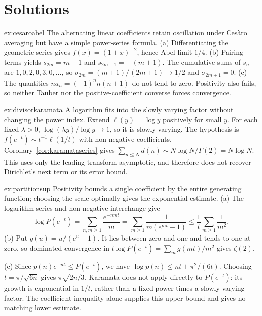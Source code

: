 \section{Solutions}
\begin{solution}{ex:cesaroabel}
\idea The alternating linear coefficients retain oscillation under Ces\`aro averaging but have a simple power-series formula.
\writeup (a) Differentiating the geometric series gives $f(x)=(1+x)^{-2}$, hence Abel limit $1/4$. (b) Pairing terms yields $s_{2m}=m+1$ and $s_{2m+1}=-(m+1)$. The cumulative sums of $s_n$ are $1,0,2,0,3,0,\ldots$, so $\sigma_{2m}=(m+1)/(2m+1)\to1/2$ and $\sigma_{2m+1}=0$. (c) The quantities $na_n=(-1)^nn(n+1)$ do not tend to zero. Positivity also fails, so neither Tauber nor the positive-coefficient converse forces convergence.
\end{solution}
\begin{solution}{ex:divisorkaramata}
\idea A logarithm fits into the slowly varying factor without changing the power index.
\writeup Extend $\ell(y)=\log y$ positively for small $y$. For each fixed $\lambda>0$, $\log(\lambda y)/\log y\to1$, so it is slowly varying. The hypothesis is $f(e^{-t})\sim t^{-1}\ell(1/t)$ with non-negative coefficients. Corollary~\ref{cor:karamataseries} gives $\sum_{n\le N}d(n)\sim N\log N/\Gamma(2)=N\log N$. This uses only the leading transform asymptotic, and therefore does not recover Dirichlet's next term or its error bound.
\end{solution}
\begin{solution}{ex:partitionsup}
\idea Positivity bounds a single coefficient by the entire generating function; choosing the scale optimally gives the exponential estimate.
\writeup (a) The logarithm series and non-negative interchange give
\[\log P(e^{-t})=\sum_{n,m\ge1}\frac{e^{-nmt}}m
 =\sum_{m\ge1}\frac1{m(e^{mt}-1)}\le\frac1t\sum_{m\ge1}\frac1{m^2}.
\]
(b) Put $g(u)=u/(e^u-1)$. It lies between zero and one and tends to one at zero, so dominated convergence in $t\log P(e^{-t})=\sum_mg(mt)/m^2$ gives $\zeta(2)$.

(c) Since $p(n)e^{-nt}\le P(e^{-t})$, we have $\log p(n)\le nt+\pi^2/(6t)$. Choosing $t=\pi/\sqrt{6n}$ gives $\pi\sqrt{2n/3}$. Karamata does not apply directly to $P(e^{-t})$: its growth is exponential in $1/t$, rather than a fixed power times a slowly varying factor. The coefficient inequality alone supplies this upper bound and gives no matching lower estimate.
\end{solution}
